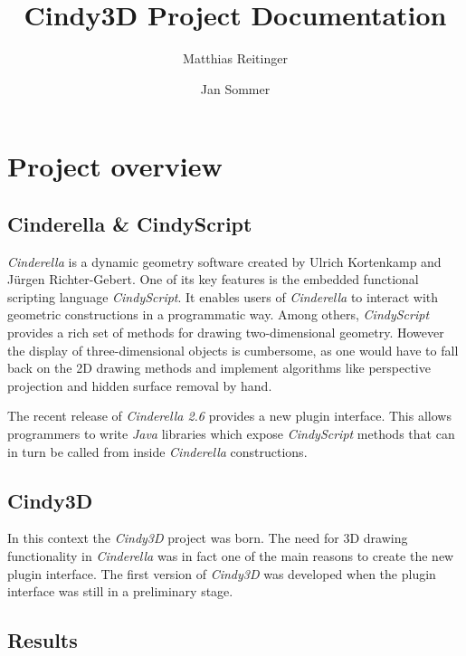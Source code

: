 \documentclass{scrartcl}
\title{Cindy3D Project Documentation}
\author{Matthias Reitinger \and Jan Sommer}
\begin{document}
\maketitle

\newpage

\tableofcontents

\newpage

\section{Project overview}

\subsection{Cinderella \& CindyScript}

\emph{Cinderella} is a dynamic geometry software created by Ulrich Kortenkamp and Jürgen Richter-Gebert. One of its key features is the embedded functional scripting language \emph{CindyScript}. It enables users of \emph{Cinderella} to interact with geometric constructions in a programmatic way. Among others, \emph{CindyScript} provides a rich set of methods for drawing two-dimensional geometry. However the display of three-dimensional objects is cumbersome, as one would have to fall back on the 2D drawing methods and implement algorithms like perspective projection and hidden surface removal by hand.

The recent release of \emph{Cinderella 2.6} provides a new plugin interface. This allows programmers to write \emph{Java} libraries which expose \emph{CindyScript} methods that can in turn be called from inside \emph{Cinderella} constructions.

\subsection{Cindy3D}

In this context the \emph{Cindy3D} project was born. The need for 3D drawing functionality in \emph{Cinderella} was in fact one of the main reasons to create the new plugin interface. The first version of \emph{Cindy3D} was developed when the plugin interface was still in a preliminary stage.

\subsection{Results}
\end{document}
